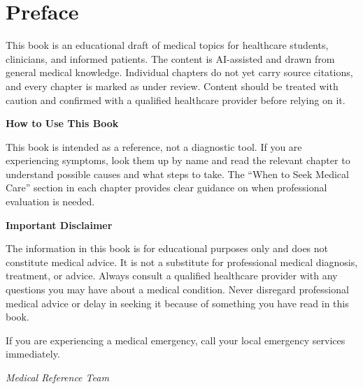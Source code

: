\chapter*{Preface}

This book is an educational draft of medical topics for healthcare students, clinicians, and informed patients. The content is AI-assisted and drawn from general medical knowledge. Individual chapters do not yet carry source citations, and every chapter is marked as under review. Content should be treated with caution and confirmed with a qualified healthcare provider before relying on it.

\medskip
\noindent\textbf{How to Use This Book}

This book is intended as a reference, not a diagnostic tool. If you are experiencing symptoms, look them up by name and read the relevant chapter to understand possible causes and what steps to take. The ``When to Seek Medical Care'' section in each chapter provides clear guidance on when professional evaluation is needed.

\medskip
\noindent\textbf{Important Disclaimer}

The information in this book is for educational purposes only and does not constitute medical advice. It is not a substitute for professional medical diagnosis, treatment, or advice. Always consult a qualified healthcare provider with any questions you may have about a medical condition. Never disregard professional medical advice or delay in seeking it because of something you have read in this book.

If you are experiencing a medical emergency, call your local emergency services immediately.

\medskip
\noindent\textit{Medical Reference Team}

\setcounter{tocdepth}{1}
\tableofcontents

\mainmatter
